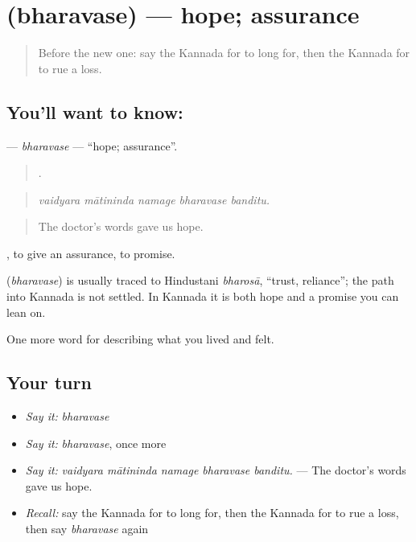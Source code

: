\section[\texorpdfstring{\kn{ಭರವಸೆ} (bharavase)}{ಭರವಸೆ (bharavase)}]{ (bharavase) — hope; assurance}

\label{lesson:KA-C496-bharavase}



\begin{quote}
Before the new one: say the Kannada for to long for, then the Kannada for to rue a loss.
\end{quote}

\subsection*{You'll want to know: }
\textbf{} — \emph{bharavase} — \textquotedblleft{}hope; assurance\textquotedblright{}.

\begin{quote}
    .
\end{quote}

\begin{quote}
\emph{vaidyara mātininda namage bharavase banditu.}
\end{quote}

\begin{quote}
The doctor's words gave us hope.
\end{quote}

 , to give an assurance, to promise.

\begin{cousinweb}
\textbf{} (\emph{bharavase}) is usually traced to Hindustani \emph{bharosā}, \textquotedblleft{}trust, reliance\textquotedblright{}; the path into Kannada is not settled. In Kannada it is both hope and a promise you can lean on.
\end{cousinweb}

\begin{grammarlens}[title={What you've built}]
One more word for describing what you lived and felt.
\end{grammarlens}

\subsection*{Your turn}
\begin{itemize}
\raggedright
  \item \emph{Say it:} \emph{bharavase}
  \item \emph{Say it:} \emph{bharavase}, once more
  \item \emph{Say it:} \emph{vaidyara mātininda namage bharavase banditu.} — The doctor's words gave us hope.
  \item \emph{Recall:} say the Kannada for to long for, then the Kannada for to rue a loss, then say \emph{bharavase} again
\end{itemize}

